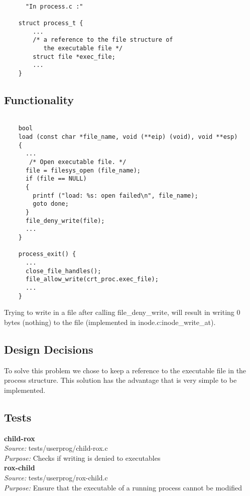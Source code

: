     \begin{lstlisting}

      "In process.c :"
	
	struct process_t {
	    ...
	    /* a reference to the file structure of 
	       the executable file */
	    struct file *exec_file;
	    ...
	}

    \end{lstlisting}


    \subsection{Functionality}
   \begin{lstlisting}

	bool
	load (const char *file_name, void (**eip) (void), void **esp) 
	{
	  ...
	   /* Open executable file. */
	  file = filesys_open (file_name);
	  if (file == NULL) 
	  {
	    printf ("load: %s: open failed\n", file_name);
	    goto done; 
	  }
	  file_deny_write(file);
	  ...
	}

	process_exit() {
	  ...
	  close_file_handles();
	  file_allow_write(crt_proc.exec_file);
	  ...
	}	
    \end{lstlisting}

    Trying to write in a file after calling file\_deny\_write, will result in writing 0 bytes (nothing) to the file (implemented in inode.c:inode\_write\_at).

    \subsection{Design Decisions}

	To solve this problem we chose to keep a reference to the executable file in the process structure. This solution has the advantage that is very simple to be implemented.

    \subsection{Tests}

    \textbf{child-rox}\\
    \textit{Source:} tests/userprog/child-rox.c\\
    \textit{Purpose:} Checks if writing is denied to executables\\

    \textbf{rox-child}\\
    \textit{Source:} tests/userprog/rox-child.c\\
    \textit{Purpose:} Ensure that the executable of a running process cannot be modified\\    

